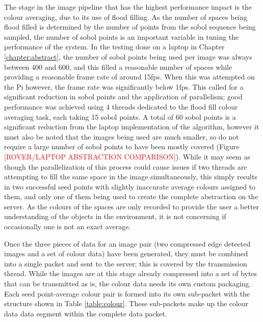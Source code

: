 The stage in the image pipeline that has the highest performance impact is the colour averaging, due to its use of flood filling. As the number of spaces being flood filled is determined by the number of points from the sobol sequence being sampled, the number of sobol points is an important variable in tuning the performance of the system. In the testing done on a laptop in Chapter \ref{chapter:abstract}, the number of sobol points being used per image was always between 400 and 600, and this filled a reasonable number of spaces while providing a reasonable frame rate of around 15fps. When this was attempted on the Pi however, the frame rate was significantly below 1fps. This called for a significant reduction in sobol points and the application of parallelism; good performance was achieved using 4 threads dedicated to the flood fill colour averaging task, each taking 15 sobol points. A total of 60 sobol points is a significant reduction from the laptop implementation of the algorithm, however it must also be noted that the images being used are much smaller, so do not require a large number of sobol points to have been mostly covered (Figure \textcolor{red}{[ROVER/LAPTOP ABSTRACTION COMPARISON]}). While it may seem as though the parallelization of this process could cause issues if two threads are attempting to fill the same space in the image simultaneously, this simply results in two successful seed points with slightly inaccurate average colours assigned to them, and only one of them being used to create the complete abstraction on the server. As the colours of the spaces are only recorded to provide the user a better understanding of the objects in the environment, it is not concerning if occasionally one is not an exact average.

Once the three pieces of data for an image pair (two compressed edge detected images and a set of colour data) have been generated, they must be combined into a single packet and sent to the server; this is covered by the transmission thread. While the images are at this stage already compressed into a set of bytes that can be transmitted as is, the colour data needs its own custom packaging. Each seed point-average colour pair is formed into its own sub-packet with the structure shown in Table \ref{table:colour}. These sub-packets make up the colour data data segment within the complete data packet.


